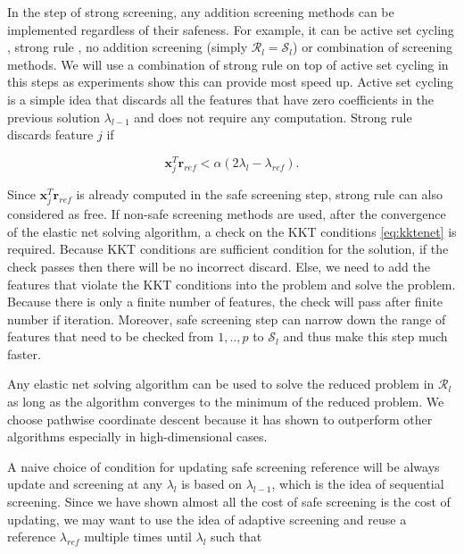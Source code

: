 In the step of strong screening, any addition screening methods can be implemented regardless of their safeness. For example, it can be active set cycling \citep{lee2007efficient}, strong rule \citep{Tibshirani2012}, no addition screening (simply $\mathcal{R}_l=\mathcal{S}_l$) or combination of screening methods. We will use a combination of strong rule on top of active set cycling in this steps as experiments show this can provide most speed up. Active set cycling is a simple idea that discards all the features that have zero coefficients in the previous solution $\lambda_{l-1}$ and does not require any computation. Strong rule discards feature $j$ if

\begin{equation}
    \label{eq:strong}
    \boldsymbol x_j^T\boldsymbol r_{ref}<\alpha(2\lambda_l-\lambda_{ref}).
\end{equation}

Since $\boldsymbol x_j^T\boldsymbol r_{ref}$ is already computed in the safe screening step, strong rule can also considered as free. If non-safe screening methods are used, after the convergence of the elastic net solving algorithm, a check on the KKT conditions \eqref{eq:kktenet} is required. Because KKT conditions are sufficient condition for the solution, if the check passes then there will be no incorrect discard. Else, we need to add the features that violate the KKT conditions into the problem and solve the problem. Because there is only a finite number of features, the check will pass after finite number if iteration. Moreover, safe screening step can narrow down the range of features that need to be checked from $1,..,p$ to $\mathcal{S}_l$ and thus make this step much faster.

Any elastic net solving algorithm can be used to solve the reduced problem in $\mathcal{R}_l$ as long as the algorithm converges to the minimum of the reduced problem. We choose pathwise coordinate descent \citep{friedman2007pathwise} because it has shown to outperform other algorithms especially in high-dimensional cases.

A naive choice of condition for updating safe screening reference will be always update and screening at any $\lambda_l$ is based on $\lambda_{l-1}$, which is the idea of sequential screening. Since we have shown almost all the cost of safe screening is the cost of updating, we may want to use the idea of adaptive screening \citep{wang2021adaptive} and reuse a reference $\lambda_{ref}$ multiple times until $\lambda_l$ such that

